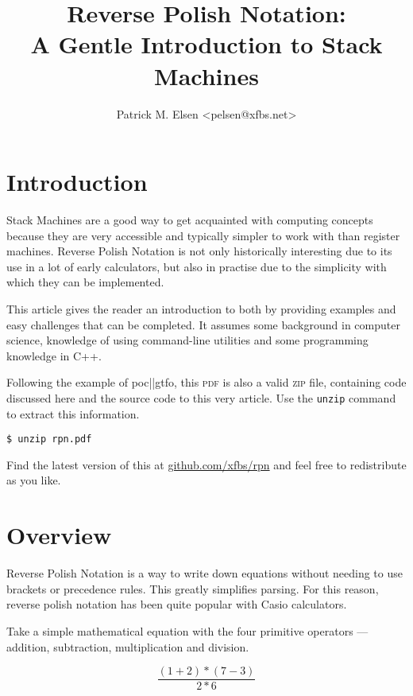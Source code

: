 \documentclass[a4paper,twocolumn]{article}
\title{Reverse Polish Notation:\\A Gentle Introduction to Stack Machines}
\author{Patrick M. Elsen <pelsen@xfbs.net>}
\date{}
\begin{document}
\maketitle
\tableofcontents

\section*{Introduction}

Stack Machines are a good way to get acquainted with computing concepts because they are very accessible and typically simpler to work with than register machines. Reverse Polish Notation is not only historically interesting due to its use in a lot of early calculators, but also in practise due to the simplicity with which they can be implemented.

This article gives the reader an introduction to both by providing examples and easy challenges that can be completed. It assumes some background in computer science, knowledge of using command-line utilities and some programming knowledge in C++.

Following the example of  poc||gtfo, this \textsc{pdf} is also a valid \textsc{zip} file, containing code discussed here and the source code to this very article. Use the \verb|unzip| command to extract this information.

\begin{verbatim}
$ unzip rpn.pdf
\end{verbatim}

Find the latest version of this at \href{https://github.com/xfbs/rpn}{github.com/xfbs/rpn} and feel free to redistribute as you like.

\section{Overview}

Reverse Polish Notation is a way to write down equations without needing to use brackets or precedence rules. This greatly simplifies parsing. For this reason, reverse polish notation has been quite popular with Casio calculators.

Take a simple mathematical equation with the four primitive operators — addition, subtraction, multiplication and division.

\begin{equation}\label{eqn:simpleeqn}
  \frac{(1 + 2) * (7 - 3)}{2 * 6}
\end{equation}
\end{document}
